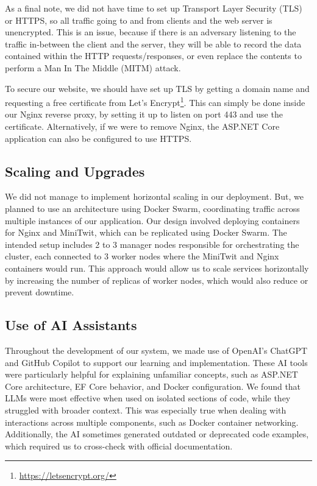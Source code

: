 \documentclass[12pt,a4paper,reqno]{report}
\begin{document}
As a final note, we did not have time to set up Transport Layer Security (TLS) or HTTPS, so all traffic going to and from clients and the web server is unencrypted. This is an issue, because if there is an adversary listening to the traffic in-between the client and the server, they will be able to record the data contained within the HTTP requests/responses, or even replace the contents to perform a Man In The Middle (MITM) attack.

To secure our website, we should have set up TLS by getting a domain name and requesting a free certificate from Let’s Encrypt\footnote{\url{https://letsencrypt.org/}}. This can simply be done inside our Nginx reverse proxy, by setting it up to listen on port 443 and use the certificate. Alternatively, if we were to remove Nginx, the ASP.NET Core application can also be configured to use HTTPS.

\subsection{Scaling and Upgrades}

We did not manage to implement horizontal scaling in our deployment. But, we planned to use an architecture using Docker Swarm, coordinating traffic across multiple instances of our application. Our design involved deploying containers for Nginx and MiniTwit, which can be replicated using Docker Swarm. The intended setup includes 2 to 3 manager nodes responsible for orchestrating the cluster, each connected to 3 worker nodes where the MiniTwit and Nginx containers would run. This approach would allow us to scale services horizontally by increasing the number of replicas of worker nodes, which would also reduce or prevent downtime.

\subsection{Use of AI Assistants}

Throughout the development of our system, we made use of OpenAI’s ChatGPT and GitHub Copilot to support our learning and implementation. These AI tools were particularly helpful for explaining unfamiliar concepts, such as ASP.NET Core architecture, EF Core behavior, and Docker configuration. We found that LLMs were most effective when used on isolated sections of code, while they struggled with broader context. This was especially true when dealing with interactions across multiple components, such as Docker container networking. Additionally, the AI sometimes generated outdated or deprecated code examples, which required us to cross-check with official documentation.
\end{document}
